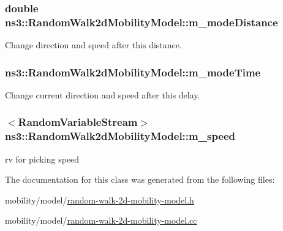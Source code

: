 \subsubsection[{\texorpdfstring{m\+\_\+mode\+Distance}{m_modeDistance}}]{\setlength{\rightskip}{0pt plus 5cm}double ns3\+::\+Random\+Walk2d\+Mobility\+Model\+::m\+\_\+mode\+Distance\hspace{0.3cm}{\ttfamily [private]}}\hypertarget{classns3_1_1RandomWalk2dMobilityModel_a4d4a9290a22236967822e8b8bdbe68a1}{}\label{classns3_1_1RandomWalk2dMobilityModel_a4d4a9290a22236967822e8b8bdbe68a1}


Change direction and speed after this distance. 

\subsubsection[{\texorpdfstring{m\+\_\+mode\+Time}{m_modeTime}}]{ ns3\+::\+Random\+Walk2d\+Mobility\+Model\+::m\+\_\+mode\+Time\hspace{0.3cm}{\ttfamily [private]}}\hypertarget{classns3_1_1RandomWalk2dMobilityModel_acdb52478fc06ca86ec0d0c5458fe1955}{}\label{classns3_1_1RandomWalk2dMobilityModel_acdb52478fc06ca86ec0d0c5458fe1955}


Change current direction and speed after this delay. 

\subsubsection[{\texorpdfstring{m\+\_\+speed}{m_speed}}]{$<${\bf Random\+Variable\+Stream}$>$ ns3\+::\+Random\+Walk2d\+Mobility\+Model\+::m\+\_\+speed\hspace{0.3cm}{\ttfamily [private]}}\hypertarget{classns3_1_1RandomWalk2dMobilityModel_a14c26c1ec6720474b5ecbaceba587d39}{}\label{classns3_1_1RandomWalk2dMobilityModel_a14c26c1ec6720474b5ecbaceba587d39}


rv for picking speed 



The documentation for this class was generated from the following files\+:\begin{DoxyCompactItemize}
\item 
mobility/model/\hyperlink{random-walk-2d-mobility-model_8h}{random-\/walk-\/2d-\/mobility-\/model.\+h}\item 
mobility/model/\hyperlink{random-walk-2d-mobility-model_8cc}{random-\/walk-\/2d-\/mobility-\/model.\+cc}\end{DoxyCompactItemize}
